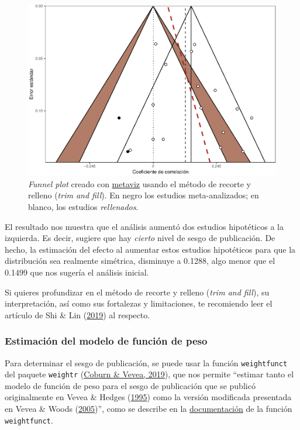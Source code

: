 \documentclass[
  bookmarksnumbered]{article}
\begin{document}
\begin{figure}
\centering
\includegraphics{Meta-analysis_files/figure-latex/tf-plot2-1.pdf}
\caption{\label{fig:tf-plot2}\emph{Funnel plot} creado con \href{https://cran.r-project.org/web/packages/metaviz/vignettes/metaviz.html}{metaviz} usando el método de recorte y relleno (\emph{trim and fill}). En negro los estudios meta-analizados; en blanco, los estudios \emph{rellenados}.}
\end{figure}

El resultado nos muestra que el análisis aumentó dos estudios hipotéticos a la izquierda. Es decir, sugiere que hay \emph{cierto} nivel de sesgo de publicación. De hecho, la estimación del efecto al aumentar estos estudios hipotéticos para que la distribución sea realmente simétrica, disminuye a 0.1288, algo menor que el 0.1499 que nos sugería el análisis inicial.

Si quieres profundizar en el método de recorte y relleno (\emph{trim and fill}), su interpretación, así como sus fortalezas y limitaciones, te recomiendo leer el artículo de Shi \& Lin (\protect\hyperlink{ref-shiTrimandfill2019}{2019}) al respecto.

\hypertarget{estimaciuxf3n-del-modelo-de-funciuxf3n-de-peso}{%
\subsubsection{Estimación del modelo de función de peso}\label{estimaciuxf3n-del-modelo-de-funciuxf3n-de-peso}}

Para determinar el sesgo de publicación, se puede usar la función \texttt{weightfunct} del paquete \texttt{weightr} (\protect\hyperlink{ref-coburnWeightr2019}{Coburn \& Vevea, 2019}), que nos permite ``estimar tanto el modelo de función de peso para el sesgo de publicación que se publicó originalmente en Vevea \& Hedges (\protect\hyperlink{ref-veveaGeneralLinearModel1995}{1995}) como la versión modificada presentada en Vevea \& Woods (\protect\hyperlink{ref-veveaPublicationBiasResearch2005}{2005})'', como se describe en la \href{https://www.rdocumentation.org/packages/weightr/versions/2.0.2/topics/weightfunct}{documentación} de la función \texttt{weightfunct}.
\end{document}
